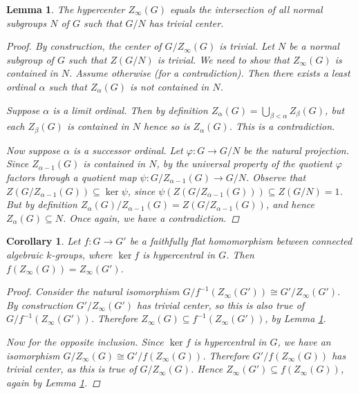 \documentclass[twoside,a4paper,reqno,11pt]{amsart}
\newtheorem{lemma}[theorem]{Lemma}
\newtheorem{corollary}[theorem]{Corollary}
\theoremstyle{definition}
\begin{document}
\begin{lemma}\label{hypercenterchar} The hypercenter $Z_\infty(G)$ equals the intersection of all normal subgroups $N$ of $G$ such that $G/N$ has trivial center. %
\begin{proof} By construction, the center of $G/Z_\infty(G)$ is trivial. Let $N$ be a normal subgroup of $G$ such that $Z(G/N)$ is trivial. We need to show that $Z_\infty(G)$ is contained in $N$. Assume otherwise (for a contradiction). Then there exists a least ordinal $\alpha$ such that $Z_\alpha(G)$ is not contained in $N$. 

\vspace{2mm}\noindent Suppose $\alpha$ is a limit ordinal. Then by definition $Z_\alpha(G)=\bigcup_{\beta<\alpha}Z_\beta(G)$, but each $Z_\beta(G)$ is contained in $N$ hence so is $Z_\alpha(G)$. This is a contradiction.

\vspace{2mm}\noindent Now suppose $\alpha$ is a successor ordinal. Let $\varphi:G\to G/N$ be the natural projection. Since $Z_{\alpha-1}(G)$ is contained in $N$, by the universal property of the quotient $\varphi$ factors through a quotient map $\psi:G/Z_{\alpha-1}(G)\to G/N$. Observe that $Z(G/Z_{\alpha-1}(G))\subseteq\ker\psi$, since $\psi(Z(G/Z_{\alpha-1}(G)))\subseteq Z(G/N)=1$. But by definition $Z_\alpha(G)/Z_{\alpha-1}(G)=Z(G/Z_{\alpha-1}(G))$, and hence $Z_{\alpha}(G)\subseteq N$. Once again, we have a contradiction.
\end{proof}
\end{lemma}

\begin{corollary}\label{hypercentercharcor} Let $f:G\to G'$ be a faithfully flat homomorphism between connected algebraic $k$-groups, where $\ker f$ is hypercentral in $G$. Then $f(Z_\infty(G))=Z_\infty(G')$. %
\begin{proof} Consider the natural isomorphism $G/f^{-1}(Z_\infty(G'))\cong G'/Z_\infty(G')$. By construction $G'/Z_\infty(G')$ has trivial center, so this is also true of $G/f^{-1}(Z_\infty(G'))$. Therefore $Z_\infty(G)\subseteq f^{-1}(Z_\infty(G'))$, by Lemma \ref{hypercenterchar}.

\vspace{2mm}\noindent Now for the opposite inclusion. Since $\ker f$ is hypercentral in $G$, we have an isomorphism $G/Z_\infty(G)\cong G'/f(Z_\infty(G))$. Therefore $G'/f(Z_\infty(G))$ has trivial center, as this is true of $G/Z_\infty(G)$. Hence $Z_\infty(G')\subseteq f(Z_\infty(G))$, again by Lemma \ref{hypercenterchar}.
\end{proof}
\end{corollary}
\end{document}
